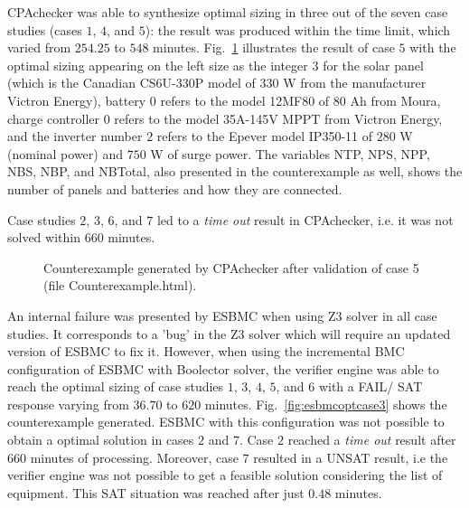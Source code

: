 \documentclass[runningheads]{llncs}
\begin{document}
CPAchecker was able to synthesize optimal sizing in three out of the seven case studies (cases $1$, $4$, and $5$): the result was produced within the time limit, which varied from $254.25$ to $548$ minutes. Fig.~\ref{fig:CPAoptc1} illustrates the result of case $5$ with the optimal sizing appearing on the left size as the integer $3$ for the solar panel (which is the Canadian CS6U-330P model of $330$ W from the manufacturer Victron Energy), battery $0$ refers to the model 12MF80 of $80$ Ah from Moura, charge controller $0$ refers to the model 35A-145V MPPT from Victron  Energy, and the inverter number $2$ refers to the Epever model IP350-11 of $280$ W (nominal power) and $750$ W of surge power. The variables NTP, NPS, NPP, NBS, NBP, and NBTotal, also presented in the counterexample as well, shows the number of panels and batteries and how they are connected.

Case studies $2$, $3$, $6$, and $7$  led to a \textit{time out} result in CPAchecker, i.e.  it was not solved within $660$ minutes.   

\begin{figure}[h]
\centering
\caption{Counterexample generated by CPAchecker after validation of case 5 (file Counterexample.html).}
\label{fig:CPAoptc1}
\end{figure}

An internal failure was presented by ESBMC when using Z3 solver in all case studies. It corresponds to a 'bug' in the Z3 solver which will require an updated version of ESBMC to fix it. However, when using the incremental BMC configuration of ESBMC with Boolector solver, the verifier engine was able to reach the optimal sizing of case studies $1$, $3$, $4$, $5$, and $6$ with a FAIL/ SAT response varying from $36.70$ to $620$ minutes. Fig.~\ref{fig:esbmcoptcase3} shows the counterexample generated.  ESBMC with this configuration was not possible to obtain a optimal solution in cases $2$ and $7$. Case $2$ reached a  \textit{time out} result after $660$ minutes of processing. Moreover, case $7$ resulted in a UNSAT result, i.e the verifier engine was not possible to get a feasible solution considering the list of equipment. This SAT situation was reached after just $0.48$ minutes.
\end{document}
